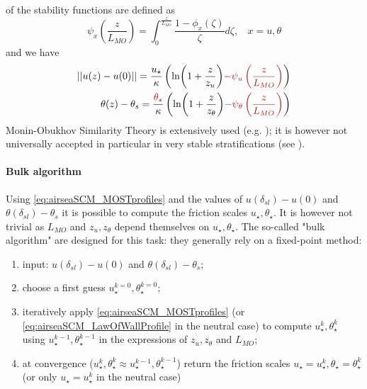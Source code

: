 of the stability functions are defined as
\begin{equation}
	\psi_x \left(\frac{z}{L_{MO}}\right)
	= \int_0^{\frac{z}{L_{MO}}}
	\frac{1 - \phi_x(\zeta)}{\zeta} d\zeta
	, ~~~~x=u,\theta
\end{equation}
and we have
\begin{equation}
\label{eq:airseaSCM_MOSTprofiles}
\begin{aligned}
	||u(z)-u(0)|| = \frac{u_\star}{\kappa}
    \left(
	\ln(1+\frac{z}{z_{u}})
	\emphase{- \psi_u\left(\frac{z}{L_{MO}}\right)}
    \right)
    \\
    \theta(z) - \theta_s = 
	\frac{\emphase{\theta_\star}}{\kappa}
    \left(
	\ln(1+\frac{z}{z_{\theta}})
	\emphase{- \psi_\theta\left(\frac{z}{L_{MO}}\right)}
\right)
\end{aligned}
\end{equation}
Monin-Obukhov Similarity Theory
is extensively used (e.g. \citep{basu_cautionary_2017});
it is however not universally
accepted in particular in very stable stratifications
(see \citep{optis_moving_2014}).
\paragraph{Bulk algorithm}
Using \eqref{eq:airseaSCM_MOSTprofiles} and the values of
$u(\delta_{sl}) - u(0)$ and $\theta(\delta_{sl}) - \theta_s$
it is possible to compute the friction scales
$u_\star, \theta_\star$. It is however not trivial as
$L_{MO}$ and $z_u, z_\theta$ depend themselves on
$u_\star, \theta_\star$.
The so-called "bulk algorithm" are designed for this
task: they generally rely on a fixed-point method:
\begin{enumerate}
\item input: $u(\delta_{sl}) - u(0)$
		and $\theta(\delta_{sl}) - \theta_s$;
\item choose a first guess $u_\star^{k=0}, \theta_\star^{k=0}$;
\item iteratively apply
	\eqref{eq:airseaSCM_MOSTprofiles} (or
	\eqref{eq:airseaSCM_LawOfWallProfile} in the neutral case)
	to compute $u_\star^{k}, \theta_\star^{k}$ using
	$u_\star^{k-1}, \theta_\star^{k-1}$
	in the expressions of $z_u, z_\theta$ and $L_{MO}$;
\item at convergence ($u_\star^{k},\theta_\star^{k} \approx
	u_\star^{k-1},\theta_\star^{k-1}$) return the friction
		scales $u_\star = u_\star^{k},
		\theta_\star = \theta_\star^{k}$ (or only
		$u_\star = u_\star^{k}$ in the neutral case)
\end{enumerate}
